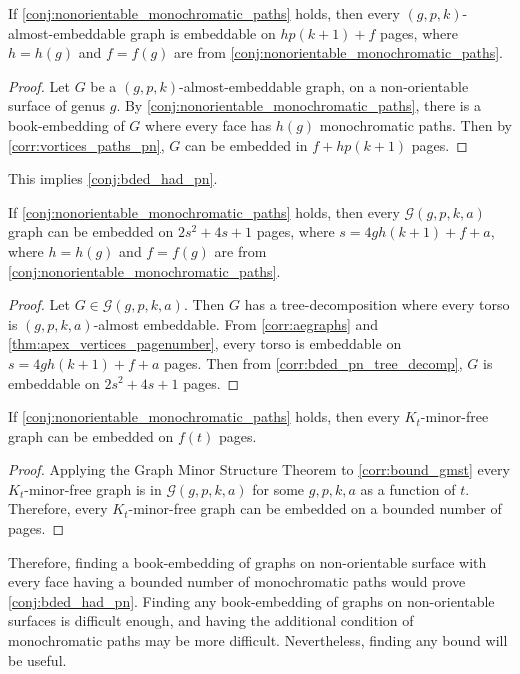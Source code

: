 \begin{corollary}\label{corr:aegraphs}
	If \cref{conj:nonorientable_monochromatic_paths} holds, then every $(g, p, k)$-almost-embeddable graph is embeddable on $h p (k + 1) + f$ pages, where $h = h(g)$ and $f = f(g)$ are from \cref{conj:nonorientable_monochromatic_paths}.
\end{corollary}

\begin{proof}
	Let $G$ be a $(g, p, k)$-almost-embeddable graph, on a non-orientable surface of genus $g$. By \cref{conj:nonorientable_monochromatic_paths}, there is a book-embedding of $G$ where every face has $h(g)$ monochromatic paths. Then by \cref{corr:vortices_paths_pn}, $G$ can be embedded in $f + h p (k+1)$ pages. 
\end{proof}

This implies \cref{conj:bded_had_pn}.
\begin{corollary}\label{corr:bound_gmst}
	If \cref{conj:nonorientable_monochromatic_paths} holds, then every $\mathcal{G}(g, p, k, a)$ graph can be embedded on $2s^2 + 4s + 1$ pages, where $s =  4g h (k + 1) + f + a$, where $h = h(g)$ and $f = f(g)$ are from \cref{conj:nonorientable_monochromatic_paths}. 
\end{corollary}

\begin{proof}
	Let $G \in \mathcal{G}(g, p, k, a)$. Then $G$ has a tree-decomposition where every torso is $(g, p, k, a)$-almost embeddable. From \cref{corr:aegraphs} and \cref{thm:apex_vertices_pagenumber}, every torso is embeddable on $s = 4g h (k + 1) + f + a$ pages. Then from \cref{corr:bded_pn_tree_decomp}, $G$ is embeddable on $2s^2 + 4s + 1$ pages.
\end{proof}

\begin{corollary}
	If \cref{conj:nonorientable_monochromatic_paths} holds, then every $K_t$-minor-free graph can be embedded on $f(t)$ pages. 
\end{corollary}

\begin{proof}
	Applying the Graph Minor Structure Theorem to \cref{corr:bound_gmst} every $K_t$-minor-free graph is in $\mathcal{G}(g, p, k, a)$ for some $g, p, k, a$ as a function of $t$. Therefore, every $K_t$-minor-free graph can be embedded on a bounded number of pages. 
\end{proof}

Therefore, finding a book-embedding of graphs on non-orientable surface with every face having a bounded number of monochromatic paths would prove \cref{conj:bded_had_pn}. Finding any book-embedding of graphs on non-orientable surfaces is difficult enough, and having the additional condition of monochromatic paths may be more difficult. Nevertheless, finding any bound will be useful.